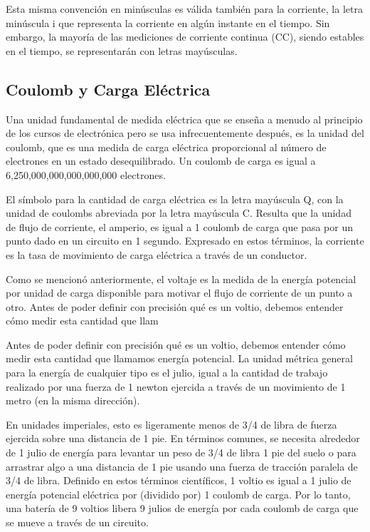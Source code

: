 \documentclass[output=paper, 
colorlinks,
citecolor=brown,
newtxmath
]{langscibook}
\begin{document}
Esta misma convención en minúsculas es válida también para la corriente, la letra minúscula i que representa la corriente en algún instante en el tiempo. Sin embargo, la mayoría de las mediciones de corriente continua (CC), siendo estables en el tiempo, se representarán con letras mayúsculas.

\subsection{Coulomb y Carga Eléctrica}
Una unidad fundamental de medida eléctrica que se enseña a menudo al principio de los cursos de electrónica pero se usa infrecuentemente después, es la unidad del coulomb, que es una medida de carga eléctrica proporcional al número de electrones en un estado desequilibrado. Un coulomb de carga es igual a 6,250,000,000,000,000,000 electrones.

El símbolo para la cantidad de carga eléctrica es la letra mayúscula Q, con la unidad de coulombs abreviada por la letra mayúscula C. Resulta que la unidad de flujo de corriente, el amperio, es igual a 1 coulomb de carga que pasa por un punto dado en un circuito en 1 segundo. Expresado en estos términos, la corriente es la tasa de movimiento de carga eléctrica a través de un conductor.

Como se mencionó anteriormente, el voltaje es la medida de la energía potencial por unidad de carga disponible para motivar el flujo de corriente de un punto a otro. Antes de poder definir con precisión qué es un voltio, debemos entender cómo medir esta cantidad que llam


Antes de poder definir con precisión qué es un voltio, debemos entender cómo medir esta cantidad que llamamos energía potencial. La unidad métrica general para la energía de cualquier tipo es el julio, igual a la cantidad de trabajo realizado por una fuerza de 1 newton ejercida a través de un movimiento de 1 metro (en la misma dirección).

En unidades imperiales, esto es ligeramente menos de 3/4 de libra de fuerza ejercida sobre una distancia de 1 pie. En términos comunes, se necesita alrededor de 1 julio de energía para levantar un peso de 3/4 de libra 1 pie del suelo o para arrastrar algo a una distancia de 1 pie usando una fuerza de tracción paralela de 3/4 de libra. Definido en estos términos científicos, 1 voltio es igual a 1 julio de energía potencial eléctrica por (dividido por) 1 coulomb de carga. Por lo tanto, una batería de 9 voltios libera 9 julios de energía por cada coulomb de carga que se mueve a través de un circuito.
\end{document}
